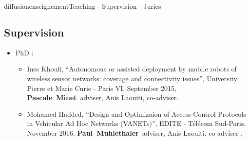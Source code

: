 \documentclass{ra2016}
\newcommand{\paul}  {\textbf{Paul~Muhlethaler}}
\newcommand{\pascale} {\textbf{Pascale~Minet}}
\begin{document}
\begin{module}{diffusion}{enseignement}{Teaching - Supervision - Juries}
\subsection {Supervision}

\begin{itemize}
    \item PhD : 
        \begin{itemize}
            \item Ines Khoufi, ``Autonomous or assisted deployment by mobile robots of wireless sensor networks: coverage and connectivity issues'', University Pierre et Marie Curie - Paris VI, September 2015, \pascale~adviser, Anis Laouiti, co-adviser.
            \item Mohamed Hadded, ``Design and Optimizaion of Access Control Protocols in Vehicular Ad Hoc Networks (VANETs)'', EDITE - T\'el\'ecom Sud-Paris, November 2016, \paul~adviser, Anis Laouiti, co-adviser .
        \end{itemize}
\end{itemize}


\end{module}
\end{document}
